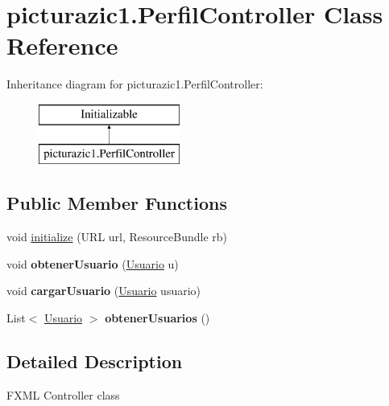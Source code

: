 \hypertarget{classpicturazic1_1_1_perfil_controller}{}\section{picturazic1.\+Perfil\+Controller Class Reference}
\label{classpicturazic1_1_1_perfil_controller}
Inheritance diagram for picturazic1.\+Perfil\+Controller\+:\begin{figure}[H]
\begin{center}
\leavevmode
\includegraphics[height=2.000000cm]{classpicturazic1_1_1_perfil_controller}
\end{center}
\end{figure}
\subsection*{Public Member Functions}
\begin{DoxyCompactItemize}
\item 
void \mbox{\hyperlink{classpicturazic1_1_1_perfil_controller_afd50104608ebc66473ab172ccad35a3f}{initialize}} (U\+RL url, Resource\+Bundle rb)
\item 
\mbox{\label{classpicturazic1_1_1_perfil_controller_a8303f3c409821b211ad8f31b9a24741a}} 
void {\bfseries obtener\+Usuario} (\mbox{\hyperlink{classmodelo_1_1_usuario}{Usuario}} u)
\item 
\mbox{\label{classpicturazic1_1_1_perfil_controller_a1bc99be85b12824079e7a1a9d24cbffe}} 
void {\bfseries cargar\+Usuario} (\mbox{\hyperlink{classmodelo_1_1_usuario}{Usuario}} usuario)
\item 
\mbox{\label{classpicturazic1_1_1_perfil_controller_a57efaadc2a0b6ce69ebc2a5ef2220f1c}} 
List$<$ \mbox{\hyperlink{classmodelo_1_1_usuario}{Usuario}} $>$ {\bfseries obtener\+Usuarios} ()
\end{DoxyCompactItemize}


\subsection{Detailed Description}
F\+X\+ML Controller class

